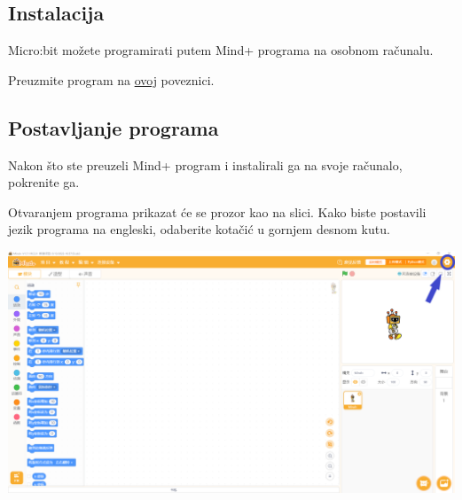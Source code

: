 \subsection{Instalacija}

Micro:bit možete programirati putem Mind+ programa na osobnom računalu.

Preuzmite program na \href{https://mindplus.cc/download-en.html}{ovoj} poveznici.


\subsection{Postavljanje programa}

Nakon što ste preuzeli Mind+ program i instalirali ga na svoje računalo, pokrenite ga.

Otvaranjem programa prikazat će se prozor kao na slici. Kako biste postavili jezik programa na engleski, odaberite kotačić u gornjem desnom kutu.

\vspace{3mm}

\includegraphics[scale=0.35]{Mindplus1.png}

